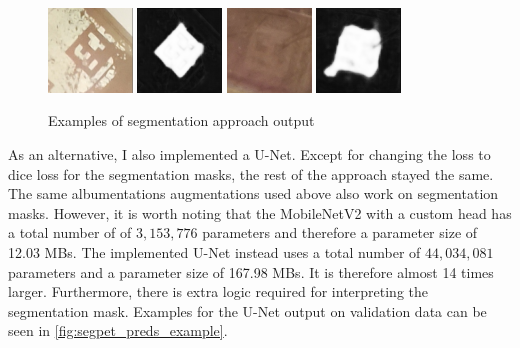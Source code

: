 \documentclass[10pt]{book}
\begin{document}
\begin{figure}
  \centering
     {\includegraphics[width=0.2\textwidth]{image/segpet_1_in}}
     {\includegraphics[width=0.2\textwidth]{image/segpet_1_pred}}
     {\includegraphics[width=0.2\textwidth]{image/segpet_3_in}}
     {\includegraphics[width=0.2\textwidth]{image/segpet_3_pred}}
  \caption{Examples of segmentation approach output}
  \label{fig:segpet_preds_example}
\end{figure}

As an alternative, I also implemented a U-Net. Except for changing the loss to dice loss for the segmentation masks, the rest of the approach stayed the same. The same albumentations augmentations used above also work on segmentation masks. However, it is worth noting that the MobileNetV2 with a custom head has a total number of of $3,153,776$ parameters and therefore a parameter size of 12.03 \acp{MB}. The implemented U-Net instead uses a total number of $44,034,081$ parameters and a parameter size of 167.98 \acp{MB}. It is therefore almost 14 times larger. Furthermore, there is extra logic required for interpreting the segmentation mask. 
Examples for the U-Net output on validation data can be seen in \autoref{fig:segpet_preds_example}. 
\end{document}
